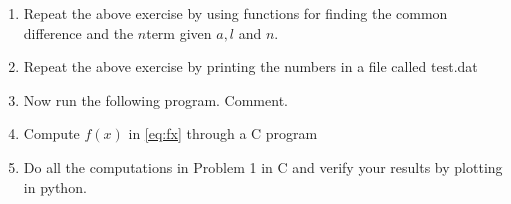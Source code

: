 \documentclass[journal,12pt,twocolumn]{IEEEtran}
\begin{document}
\begin{enumerate}
\solution

\item
Repeat the above exercise by using functions for finding the common difference
and the $n$term given $a,l$ and $n$.

\solution

\item
Repeat the above exercise by printing the numbers in a file called test.dat

\solution

\item
Now run the following program.  Comment.


\item
Compute $f(x)$ in \eqref{eq:fx} through a C program

\solution

\item
Do all the computations in Problem 1 in C and verify your results by plotting in python.

\end{enumerate}
\end{document}
